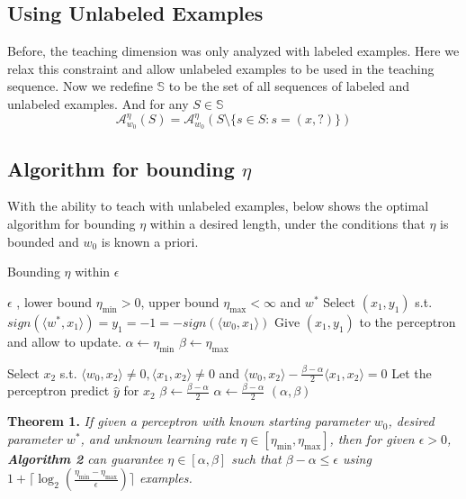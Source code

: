 \documentclass{article}
\newcommand{\learn}{\mathcal{A}_{w_0}^\eta}
\begin{document}
\subsection{Using Unlabeled Examples}
Before, the teaching dimension was only analyzed with labeled examples. Here we relax this constraint and allow unlabeled examples to be used in the teaching sequence. Now we redefine $\mathbb{S}$ to be the set of all sequences of labeled and unlabeled examples. And for any $S \in \mathbb{S}$
$$
\learn(S) = \learn(S \setminus \{s \in S : s = (x, ?)\} )
$$

\subsection{Algorithm for bounding $\eta$}
With the ability to teach with unlabeled examples, below shows the optimal algorithm for bounding $\eta$ within a desired length, under the conditions that $\eta$ is bounded and $w_0$ is known a priori.

\begin{algorithm}
\caption{Bounding $\eta$ within $\epsilon$ }
\begin{algorithmic}[1]
	\REQUIRE $\epsilon$ , lower bound $\eta_{\min} > 0$, upper bound $\eta_{\max} < \infty$ and $w^*$
	\STATE Select $(x_1 , y_1)$ s.t. $sign(\langle w^* , x_1 \rangle) = y_1 = -1 = 
	-sign(\langle w_0 , x_1 \rangle )$
	\STATE Give $(x_1, y_1)$ to the perceptron and allow to update.
	\STATE $\alpha \leftarrow \eta_{\min}$
	\STATE $\beta \leftarrow \eta_{\max}$
	
	\WHILE{$\beta - \alpha > \epsilon$}
		\STATE Select $ x_2$ s.t. $\langle w_0 , x_2 \rangle \neq 0, \langle x_1 , x_2 \rangle \neq 0$ and $\langle w_0, x_2 \rangle - \frac{\beta - \alpha}{2}\langle x_1, x_2 \rangle = 0$
		\STATE Let the perceptron predict $\hat{y}$ for $x_2$
			\STATE $ \beta \leftarrow \frac{\beta - \alpha}{2}$ 		
		\ELSE
			\STATE $ \alpha \leftarrow \frac{\beta - \alpha}{2}$ 
		\ENDIF	
	\ENDWHILE   
	\RETURN $(\alpha , \beta)$
\end{algorithmic}
\end{algorithm} 

\textbf{Theorem 1.}
\textit{
If given a perceptron with known starting parameter $w_0$, desired parameter $w^*$, and unknown 
learning rate $\eta \in [\eta_{\min} , \eta_{\max}]$, then for given $\epsilon > 0$, \textbf{Algorithm 2} can guarantee $\eta \in 
[\alpha, \beta]$ such that $\beta - \alpha \leq \epsilon$ using $1 + \lceil \log_2(\frac{\eta_
{\min} - \eta_{\max}}{\epsilon})\rceil$ examples.}
\end{document}
